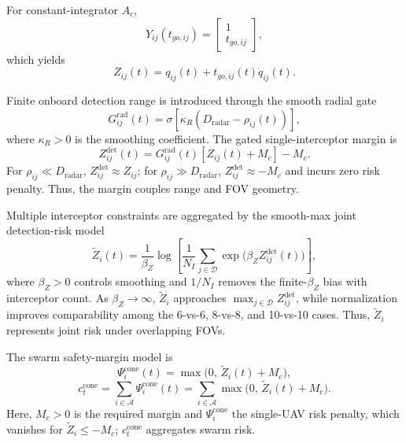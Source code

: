 \documentclass{cja}
\begin{document}
For constant-integrator $A_c$,
\begin{equation}
Y_{ij}(t_{go,ij})
=
\begin{bmatrix}
1\\
t_{go,ij}
\end{bmatrix},
\end{equation}
which yields
\begin{equation}
Z_{ij}(t)
=
q_{ij}(t)+t_{go,ij}(t)\dot q_{ij}(t).
\end{equation}

Finite onboard detection range is introduced through the smooth radial gate
\begin{equation}
G_{ij}^{\mathrm{rad}}(t)
=
\sigma\!\left[\kappa_R\left(D_{\mathrm{radar}}-\rho_{ij}(t)\right)\right],
\end{equation}
where $\kappa_R>0$ is the smoothing coefficient. The gated single-interceptor margin is
\begin{equation}
Z_{ij}^{\mathrm{det}}(t)
=
G_{ij}^{\mathrm{rad}}(t)\left[Z_{ij}(t)+M_c\right]-M_c.
\end{equation}
For $\rho_{ij}\ll D_{\mathrm{radar}}$, $Z_{ij}^{\mathrm{det}}\approx Z_{ij}$; for $\rho_{ij}\gg D_{\mathrm{radar}}$, $Z_{ij}^{\mathrm{det}}\approx-M_c$ and incurs zero risk penalty. Thus, the margin couples range and FOV geometry.

Multiple interceptor constraints are aggregated by the smooth-max joint detection-risk model
\begin{equation}
\widetilde Z_i(t)
=
\frac{1}{\beta_Z}
\log\left[
\frac{1}{N_I}
\sum_{j\in\mathcal{D}}
\exp\!\bigl(\beta_Z Z_{ij}^{\mathrm{det}}(t)\bigr)
\right],
\end{equation}
where $\beta_Z>0$ controls smoothing and $1/N_I$ removes the finite-$\beta_Z$ bias with interceptor count. As $\beta_Z\to\infty$, $\widetilde Z_i$ approaches $\max_{j\in\mathcal D}Z_{ij}^{\mathrm{det}}$, while normalization improves comparability among the 6-vs-6, 8-vs-8, and 10-vs-10 cases. Thus, $\widetilde Z_i$ represents joint risk under overlapping FOVs.

The swarm safety-margin model is
\begin{equation}
\Psi_i^{\mathrm{cone}}(t)
=
\max\bigl(0,\, \widetilde Z_i(t)+M_c\bigr),
\end{equation}
\begin{equation}
c_t^{\mathrm{cone}}
=
\sum_{i\in\mathcal{A}}
\Psi_i^{\mathrm{cone}}(t)
=
\sum_{i\in\mathcal{A}}
\max\bigl(0,\, \widetilde Z_i(t)+M_c\bigr).
\end{equation}
Here, $M_c>0$ is the required margin and $\Psi_i^{\mathrm{cone}}$ the single-UAV risk penalty, which vanishes for $\widetilde Z_i\le-M_c$; $c_t^{\mathrm{cone}}$ aggregates swarm risk.
\end{document}
